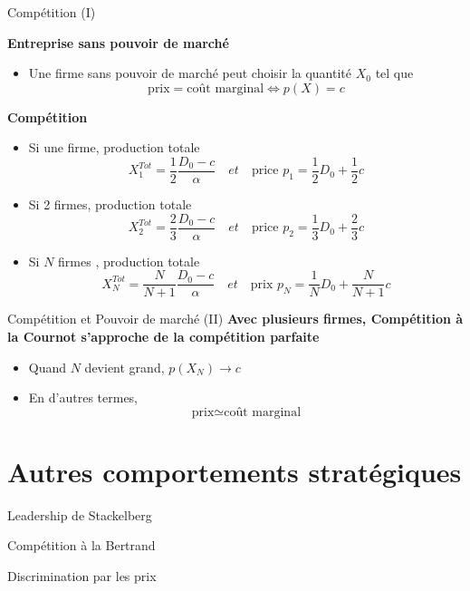 \documentclass[handout]{beamer}
\newenvironment{iPar}[1]{\textbf{#1} \begin{itemize}}{\end{itemize}}
\newcommand{\mdp}{\medskip \pause}
\begin{document}
\begin{frame}{Compétition (I)}


\begin{iPar}{Entreprise sans pouvoir de marché}
\item Une firme sans pouvoir de marché peut choisir la quantité $X_0$  tel que $$\textrm{prix} = \textrm{coût marginal} \iff p(X) = c$$
\end{iPar}\mdp

\begin{iPar}{Compétition}
\item Si une firme, production totale $$X^{Tot}_1 = \frac{1}{2}\frac{D_0-c}{\alpha} \quad  et \quad \textrm{price } p_1 = \frac{1}{2} D_0  + \frac{1}{2} c$$
\item Si 2 firmes, production totale $$X^{Tot}_2 = \frac{2}{3}\frac{D_0-c}{\alpha} \quad  et \quad \textrm{price } p_2  = \frac{1}{3}D_0 +\frac{2}{3}c$$
\item Si $N$ firmes , production totale $$X^{Tot}_N = \frac{N}{N+1}\frac{D_0-c}{\alpha} \quad  et \quad \textrm{prix } p_N = \frac{1}{N}D_0 +\frac{N}{N+1}c$$

\end{iPar}
\end{frame}


\begin{frame}{Compétition et Pouvoir de marché (II)}
\begin{iPar}{Avec plusieurs firmes, Compétition à la Cournot s'approche de la compétition parfaite}
\item Quand $N$ devient grand, $p(X_N) \to c$
\item En d'autres termes, $$\textrm{prix} \simeq \textrm{coût marginal}$$
\end{iPar}
\end{frame}


\section{Autres comportements stratégiques}

\begin{frame}{Leadership de Stackelberg}

\end{frame}


\begin{frame}{Compétition à la Bertrand}

\end{frame}

\begin{frame}{Discrimination par les prix}

\end{frame}
\end{document}

